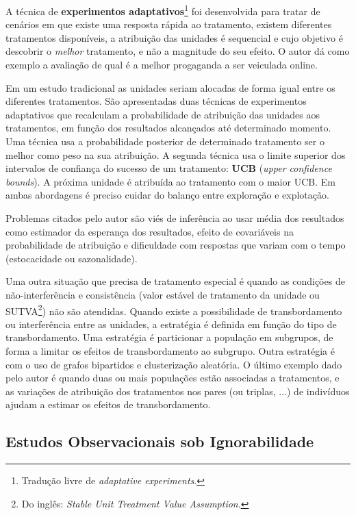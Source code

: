 \documentclass[final,5p]{elsarticle}
\numberwithin{equation}{section}
\begin{document}
    A técnica de \textbf{experimentos adaptativos}\footnote{Tradução livre de \textit{adaptative experiments}.} foi desenvolvida para tratar de cenários em que existe uma resposta rápida ao tratamento, existem diferentes tratamentos disponíveis, a atribuição das unidades é sequencial e cujo objetivo é descobrir o \textit{melhor} tratamento, e não a magnitude do seu efeito. O autor dá como exemplo a avaliação de qual é a melhor progaganda a ser veiculada online.

    Em um estudo tradicional as unidades seriam alocadas de forma igual entre os diferentes tratamentos. São apresentadas duas técnicas de experimentos adaptativos que recalculam a probabilidade de atribuição das unidades aos tratamentos, em função dos resultados alcançados até determinado momento. Uma técnica usa a probabilidade posterior de determinado tratamento ser o melhor como peso na sua atribuição. A segunda técnica usa o limite superior dos intervalos de confiança do sucesso de um tratamento: \textbf{UCB} (\textit{upper confidence bounds}). A próxima unidade é atribuída ao tratamento com o maior UCB. Em ambas abordagens é preciso cuidar do balanço entre exploração e explotação.

    Problemas citados pelo autor são viés de inferência ao usar média dos resultados como estimador da esperança dos resultados, efeito de covariáveis na probabilidade de atribuição e dificuldade com respostas que variam com o tempo (estocacidade ou sazonalidade).

    Uma outra situação que precisa de tratamento especial é quando as condições de não-interferência e consistência (valor estável de tratamento da unidade ou SUTVA\footnote{Do inglês: \textit{Stable Unit Treatment Value Assumption}.}) não são atendidas. Quando existe a possibilidade de transbordamento ou interferência entre as unidades, a estratégia é definida em função do tipo de transbordamento. Uma estratégia é particionar a população em subgrupos, de forma a limitar os efeitos de transbordamento ao subgrupo. Outra estratégia é com o uso de grafos bipartidos e clusterização aleatória. O último exemplo dado pelo autor é quando duas ou mais populações estão associadas a tratamentos, e as variações de atribuição dos tratamentos nos pares (ou triplas, ...) de indivíduos ajudam a estimar os efeitos de transbordamento.

    \subsection{Estudos Observacionais sob Ignorabilidade}
\end{document}
